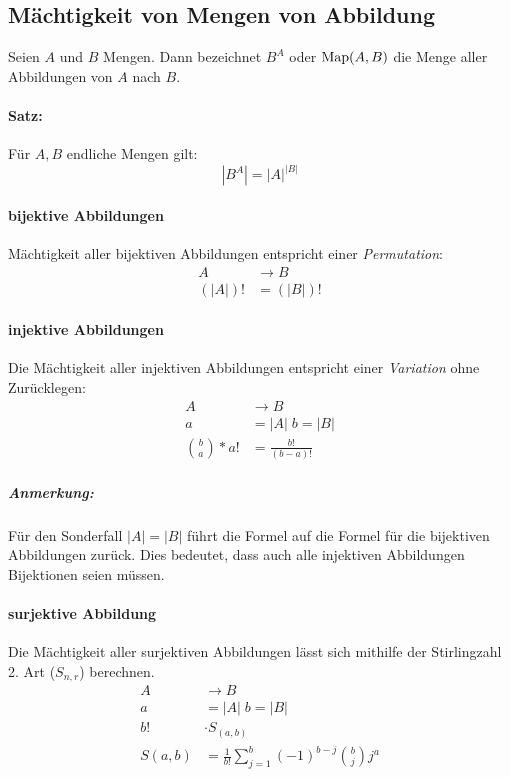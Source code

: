 \subsection{Mächtigkeit von Mengen von Abbildung}
Seien $A$ und $B$ Mengen.
Dann bezeichnet $B^A$ oder $\text{Map}(A,B)$ die Menge aller Abbildungen von $A$
nach $B$. \paragraph*{Satz:}
Für $A, B$ endliche Mengen gilt:
$$ |B^A| = {|A|}^{|B|} $$

\paragraph*{bijektive Abbildungen}
Mächtigkeit aller bijektiven Abbildungen entspricht einer \emph{Permutation}:
\begin{align*}
  A &\rightarrow B \\
  (|A|)! &= (|B|)!
\end{align*}

\paragraph*{injektive Abbildungen}
Die Mächtigkeit aller injektiven Abbildungen entspricht einer
\emph{Variation} ohne Zurücklegen:
\begin{align*}
  A &\rightarrow B \\
  a &= |A| \; b = |B| \\
  {{b}\choose{a}} * a!
  &= \frac{b!}{(b-a)!}
\end{align*}

\subparagraph*{Anmerkung:} Für den Sonderfall $|A|=|B|$ führt die Formel auf die Formel für die bijektiven Abbildungen zurück. Dies bedeutet, dass auch alle injektiven Abbildungen Bijektionen seien müssen.

\paragraph*{surjektive Abbildung}
Die Mächtigkeit aller surjektiven Abbildungen lässt sich mithilfe der
Stirlingzahl 2. Art ($S_{n,r}$) berechnen.
\begin{align*}
  A &\rightarrow B \\
  a &= |A| \; b = |B| \\
  b!    &\cdot S_{(a,b)}\\
  S(a,b)&=\frac{1}{b!}\sum_{j=1}^{b}(-1)^{b-j}{b \choose j}j^a
\end{align*}